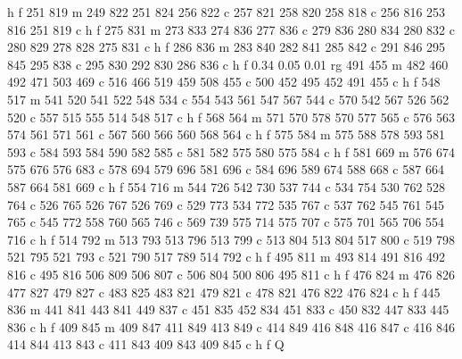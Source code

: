 {{   h f
   251 819 m
   249 822 251 824 256 822 c
   257 821 258 820 258 818 c
   256 816 253 816 251 819 c
   h f
   275 831 m
   273 833 274 836 277 836 c
   279 836 280 834 280 832 c
   280 829 278 828 275 831 c
   h f
   286 836 m
   283 840 282 841 285 842 c
   291 846 295 845 295 838 c
   295 830 292 830 286 836 c
   h f
   0.34 0.05 0.01 rg
   491 455 m
   482 460 492 471 503 469 c
   516 466 519 459 508 455 c
   500 452 495 452 491 455 c
   h f
   548 517 m
   541 520 541 522 548 534 c
   554 543 561 547 567 544 c
   570 542 567 526 562 520 c
   557 515 555 514 548 517 c
   h f
   568 564 m
   571 570 578 570 577 565 c
   576 563 574 561 571 561 c
   567 560 566 560 568 564 c
   h f
   575 584 m
   575 588 578 593 581 593 c
   584 593 584 590 582 585 c
   581 582 575 580 575 584 c
   h f
   581 669 m
   576 674 575 676 576 683 c
   578 694 579 696 581 696 c
   584 696 589 674 588 668 c
   587 664 587 664 581 669 c
   h f
   554 716 m
   544 726 542 730 537 744 c
   534 754 530 762 528 764 c
   526 765 526 767 526 769 c
   529 773 534 772 535 767 c
   537 762 545 761 545 765 c
   545 772 558 760 565 746 c
   569 739 575 714 575 707 c
   575 701 565 706 554 716 c
   h f
   514 792 m
   513 793 513 796 513 799 c
   513 804 513 804 517 800 c
   519 798 521 795 521 793 c
   521 790 517 789 514 792 c
   h f
   495 811 m
   493 814 491 816 492 816 c
   495 816 506 809 506 807 c
   506 804 500 806 495 811 c
   h f
   476 824 m
   476 826 477 827 479 827 c
   483 825 483 821 479 821 c
   478 821 476 822 476 824 c
   h f
   445 836 m
   441 841 443 841 449 837 c
   451 835 452 834 451 833 c
   450 832 447 833 445 836 c
   h f
   409 845 m
   409 847 411 849 413 849 c
   414 849 416 848 416 847 c
   416 846 414 844 413 843 c
   411 843 409 843 409 845 c
   h f
   Q
}}

